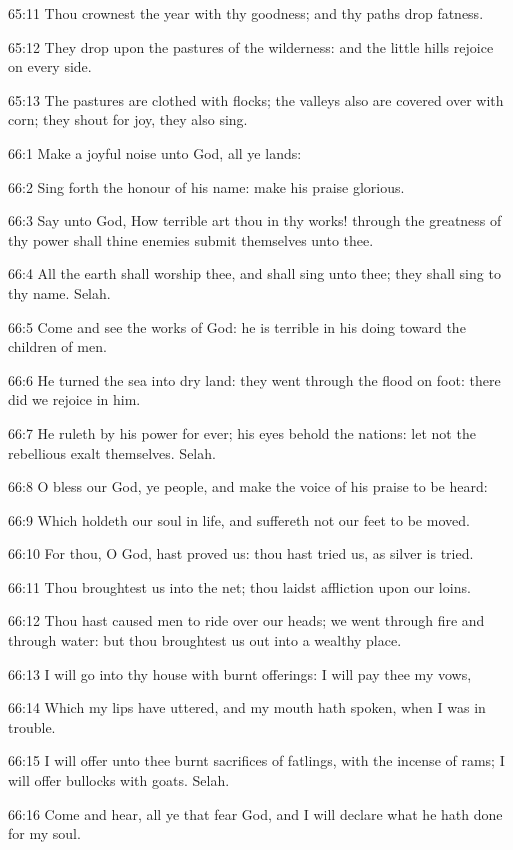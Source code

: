 65:11 Thou crownest the year with thy goodness; and thy paths drop fatness.

65:12 They drop upon the pastures of the wilderness: and the little hills rejoice on every side.

65:13 The pastures are clothed with flocks; the valleys also are covered over with corn; they shout for joy, they also sing.



66:1 Make a joyful noise unto God, all ye lands:

66:2 Sing forth the honour of his name: make his praise glorious.

66:3 Say unto God, How terrible art thou in thy works! through the greatness of thy power shall thine enemies submit themselves unto thee.

66:4 All the earth shall worship thee, and shall sing unto thee; they shall sing to thy name. Selah.

66:5 Come and see the works of God: he is terrible in his doing toward the children of men.

66:6 He turned the sea into dry land: they went through the flood on foot: there did we rejoice in him.

66:7 He ruleth by his power for ever; his eyes behold the nations: let not the rebellious exalt themselves. Selah.

66:8 O bless our God, ye people, and make the voice of his praise to be heard:

66:9 Which holdeth our soul in life, and suffereth not our feet to be moved.

66:10 For thou, O God, hast proved us: thou hast tried us, as silver is tried.

66:11 Thou broughtest us into the net; thou laidst affliction upon our loins.

66:12 Thou hast caused men to ride over our heads; we went through fire and through water: but thou broughtest us out into a wealthy place.

66:13 I will go into thy house with burnt offerings: I will pay thee my vows,

66:14 Which my lips have uttered, and my mouth hath spoken, when I was in trouble.

66:15 I will offer unto thee burnt sacrifices of fatlings, with the incense of rams; I will offer bullocks with goats. Selah.

66:16 Come and hear, all ye that fear God, and I will declare what he hath done for my soul.

